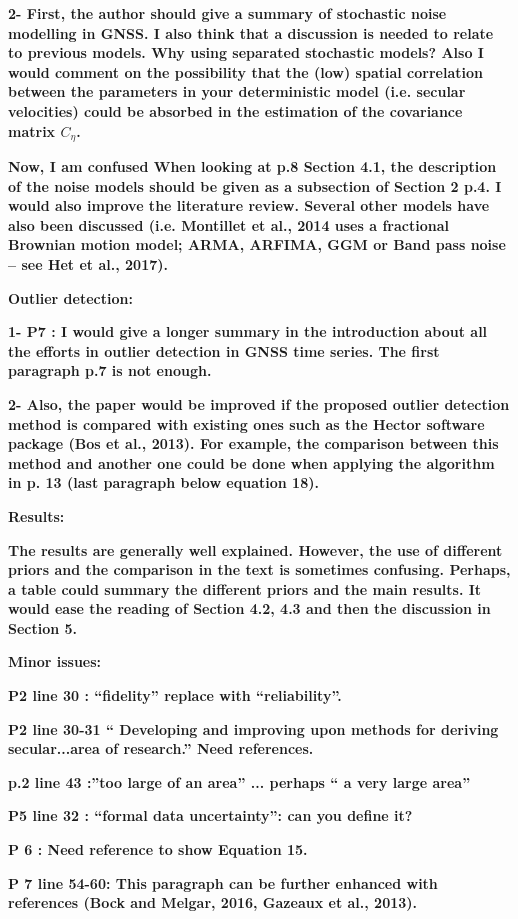 \documentclass[10pt,a4paper]{letter}
\begin{document}
\begin{letter}{}
\textbf{2- First, the author should give a summary of stochastic noise
modelling in GNSS. I also think that a discussion is needed to relate
to previous models. Why using separated stochastic models? Also I
would comment on the possibility that the (low) spatial correlation
between the parameters in your deterministic model (i.e. secular
velocities) could be absorbed in the estimation of the covariance
matrix $C_{\eta}$.}


\textbf{Now, I am confused When looking at p.8 Section 4.1, the description of
the noise models should be given as a subsection of Section 2 p.4. I
would also improve the literature review. Several other models have
also been discussed (i.e. Montillet et al., 2014 uses a fractional
Brownian motion model; ARMA, ARFIMA, GGM or Band pass noise – see Het
et al., 2017).}

\textbf{Outlier detection:}

\textbf{1- P7 : I would give a longer summary in the introduction about all
the efforts in outlier detection in GNSS time series. The first
paragraph p.7 is not enough.}


\textbf{2- Also, the paper would be improved if the proposed outlier detection
method is compared with existing ones such as the Hector software
package (Bos et al., 2013). For example, the comparison between this
method and another one could be done when applying the algorithm in p.
13 (last paragraph below equation 18).}


\textbf{Results:}

\textbf{The results are generally well explained. However, the use of
different priors and the comparison in the text is sometimes
confusing. Perhaps, a table could summary the different priors and the
main results. It would ease the reading of Section 4.2, 4.3 and then
the discussion in Section 5.}


\textbf{Minor issues:}

\textbf{P2 line 30 : “fidelity” replace with “reliability”.}

\textbf{P2 line 30-31 “ Developing and improving upon methods for deriving
secular...area of research.” Need references.}

\textbf{p.2 line 43 :”too large of an area” ... perhaps “ a very large area”}

\textbf{P5 line 32 : “formal data uncertainty”: can you define it?}

\textbf{P 6 : Need reference to show Equation 15.}

\textbf{P 7 line 54-60: This paragraph can be further enhanced with references
(Bock and Melgar, 2016, Gazeaux et al., 2013).}


\end{letter}
\end{document}
